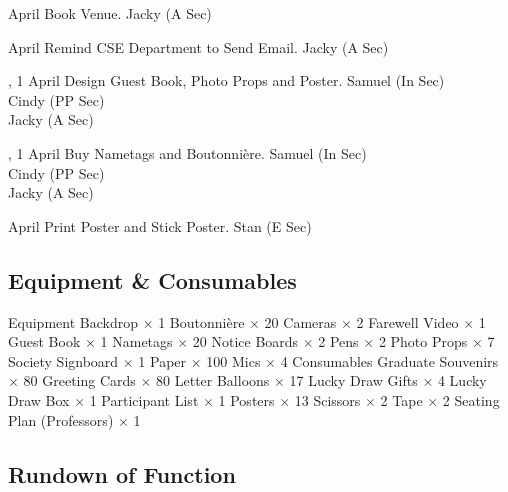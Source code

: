 \bTR{}
\eTD{} April
\eTD\bTD Book Venue.
\eTD\bTD Jacky (A Sec)
\eTD\eTR

\bTR{}
\eTD{} April
\eTD\bTD Remind CSE Department to Send Email.
\eTD\bTD Jacky (A Sec)
\eTD\eTR

\bTR{}, 1
\eTD{} April
\eTD\bTD Design Guest Book, Photo Props and Poster.
\eTD\bTD Samuel (In Sec) \\ Cindy (PP Sec) \\ Jacky (A Sec)
\eTD\eTR

\bTR{}, 1
\eTD{} April
\eTD\bTD Buy Nametags and Boutonnière.
\eTD\bTD Samuel (In Sec) \\ Cindy (PP Sec) \\ Jacky (A Sec)
\eTD\eTR

\bTR{}
\eTD{} April
\eTD\bTD Print Poster and Stick Poster.
\eTD\bTD Stan (E Sec)
\eTD\eTR

\eTABLEbody
\eTABLE

\subsection{Equipment \& Consumables}
\starttabulate[|l|l|]
\NC{}Equipment\NC\NR
\HL
\NC Backdrop            \NC $\times$ 1  \NR
\NC Boutonnière         \NC $\times$ 20 \NR
\NC Cameras             \NC $\times$ 2  \NR
\NC Farewell Video      \NC $\times$ 1  \NR
\NC Guest Book          \NC $\times$ 1  \NR
\NC Nametags            \NC $\times$ 20 \NR
\NC Notice Boards       \NC $\times$ 2  \NR
\NC Pens                \NC $\times$ 2  \NR
\NC Photo Props         \NC $\times$ 7  \NR
\NC Society Signboard   \NC $\times$ 1  \NR
\NC Paper               \NC $\times$ 100\NR
\NC Mics                \NC $\times$ 4  \NR
\HL
\NR
\NC{}Consumables\NC\NR
\HL
\NC Graduate Souvenirs  \NC $\times$ 80 \NR
\NC Greeting Cards      \NC $\times$ 80 \NR
\NC Letter Balloons     \NC $\times$ 17 \NR
\NC Lucky Draw Gifts    \NC $\times$ 4  \NR
\NC Lucky Draw Box      \NC $\times$ 1  \NR
\NC Participant List    \NC $\times$ 1  \NR
\NC Posters             \NC $\times$ 13 \NR
\NC Scissors            \NC $\times$ 2  \NR
\NC Tape                \NC $\times$ 2  \NR
\NC Seating Plan (Professors) \NC $\times$ 1  \NR
\HL
\stoptabulate

\pagebreak
\subsection{Rundown of Function}

